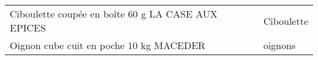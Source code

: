 \begin{longtable}{p{5cm}p{10cm}}
                                                       Ciboulette coupée en boîte 60 g LA CASE AUX EPICES &                                                                                                                                                                                                                                                                                                                                                                                                                                                                                                                                                                                                                                                                                                                                                                                                                                                                                                                                                                                                                               Ciboulette \\
                                                                  Oignon cube cuit en poche 10 kg MACEDER &                                                                                                                                                                                                                                                                                                                                                                                                                                                                                                                                                                                                                                                                                                                                                                                                                                                                                                                                                                                                                                  oignons \\

\end{longtable}
